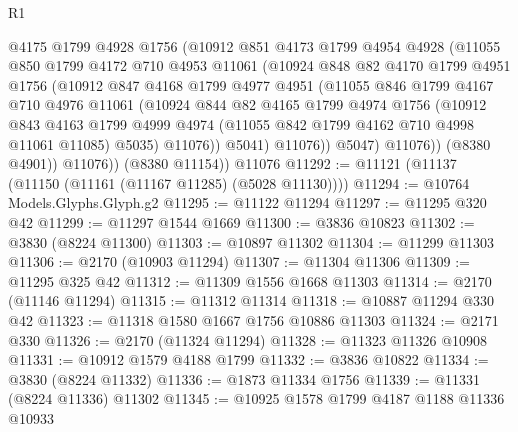 \begin{lexlean}{R1}
\begin{coremodule}
                @4175
                @1799
                @4928
                @1756
                (@10912
                  @851
                  @4173
                  @1799
                  @4954
                  @4928
                  (@11055
                    @850
                    @1799
                    @4172
                    @710
                    @4953
                    @11061
                    (@10924
                      @848
                      @82
                      @4170
                      @1799
                      @4951
                      @1756
                      (@10912
                        @847
                        @4168
                        @1799
                        @4977
                        @4951
                        (@11055
                          @846
                          @1799
                          @4167
                          @710
                          @4976
                          @11061
                          (@10924
                            @844
                            @82
                            @4165
                            @1799
                            @4974
                            @1756
                            (@10912
                              @843
                              @4163
                              @1799
                              @4999
                              @4974
                              (@11055 @842 @1799 @4162 @710 @4998 @11061 @11085)
                              @5035)
                            @11076))
                        @5041)
                      @11076))
                  @5047)
                @11076))
            (@8380 @4901))
          @11076))
      (@8380 @11154))
    @11076
@11292 := @11121 (@11137 (@11150 (@11161 (@11167 @11285) (@5028 @11130))))
@11294 := @10764 Models.Glyphs.Glyph.g2
@11295 := @11122 @11294
@11297 := @11295 @320 @42
@11299 := @11297 @1544 @1669
@11300 := @3836 @10823
@11302 := @3830 (@8224 @11300)
@11303 := @10897 @11302
@11304 := @11299 @11303
@11306 := @2170 (@10903 @11294)
@11307 := @11304 @11306
@11309 := @11295 @325 @42
@11312 := @11309 @1556 @1668 @11303
@11314 := @2170 (@11146 @11294)
@11315 := @11312 @11314
@11318 := @10887 @11294 @330 @42
@11323 := @11318 @1580 @1667 @1756 @10886 @11303
@11324 := @2171 @330
@11326 := @2170 (@11324 @11294)
@11328 := @11323 @11326 @10908
@11331 := @10912 @1579 @4188 @1799
@11332 := @3836 @10822
@11334 := @3830 (@8224 @11332)
@11336 := @1873 @11334 @1756
@11339 := @11331 (@8224 @11336) @11302
@11345 := @10925 @1578 @1799 @4187 @1188 @11336 @10933

\end{coremodule}
\end{lexlean}
